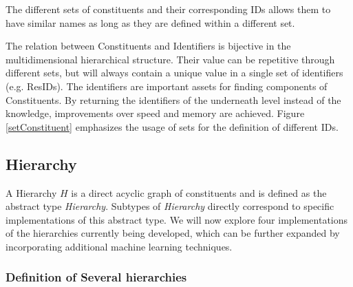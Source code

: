 \begin{marginfigure}
\centering
\vspace{1cm}

\vspace{0.3cm}
\caption{The different sets of constituents and their corresponding IDs allows them to have similar names as long as they are defined within a different set.}
\label{setConstituent} 
\end{marginfigure}



The relation between Constituents and Identifiers is bijective in the multidimensional hierarchical structure. Their value can be repetitive through different sets, but will always contain a unique value in a single set of identifiers (e.g. ResIDs). The identifiers are important assets for finding components of Constituents. By returning the identifiers of the underneath level instead of the knowledge, improvements over speed and memory are achieved. Figure \ref{setConstituent} emphasizes the usage of sets for the definition of different IDs.


\subsection{Hierarchy}
A Hierarchy $H$ is a direct acyclic graph of constituents and is defined as the abstract type \textit{Hierarchy}. Subtypes of \textit{Hierarchy} directly correspond to specific implementations of this abstract type.  We will now explore four implementations of the hierarchies currently being developed, which can be further expanded by incorporating additional machine learning techniques.


\subsubsection{Definition of Several hierarchies}



